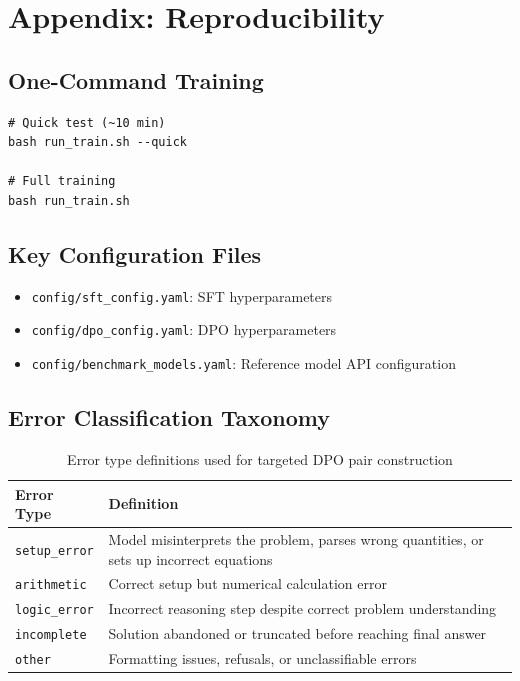 \documentclass{article}
\begin{document}



\appendix
\section{Appendix: Reproducibility}

\subsection{One-Command Training}
\begin{lstlisting}[basicstyle=\ttfamily\small, frame=single]
# Quick test (~10 min)
bash run_train.sh --quick

# Full training
bash run_train.sh
\end{lstlisting}

\subsection{Key Configuration Files}
\begin{itemize}[noitemsep]
    \item \texttt{config/sft\_config.yaml}: SFT hyperparameters
    \item \texttt{config/dpo\_config.yaml}: DPO hyperparameters
    \item \texttt{config/benchmark\_models.yaml}: Reference model API configuration
\end{itemize}

\subsection{Error Classification Taxonomy}
\begin{table}[H]
\centering
\caption{Error type definitions used for targeted DPO pair construction}
\begin{tabular}{lp{10cm}}
\toprule
\textbf{Error Type} & \textbf{Definition} \\
\midrule
\texttt{setup\_error} & Model misinterprets the problem, parses wrong quantities, or sets up incorrect equations \\
\texttt{arithmetic} & Correct setup but numerical calculation error \\
\texttt{logic\_error} & Incorrect reasoning step despite correct problem understanding \\
\texttt{incomplete} & Solution abandoned or truncated before reaching final answer \\
\texttt{other} & Formatting issues, refusals, or unclassifiable errors \\
\bottomrule
\end{tabular}
\end{table}
\end{document}

